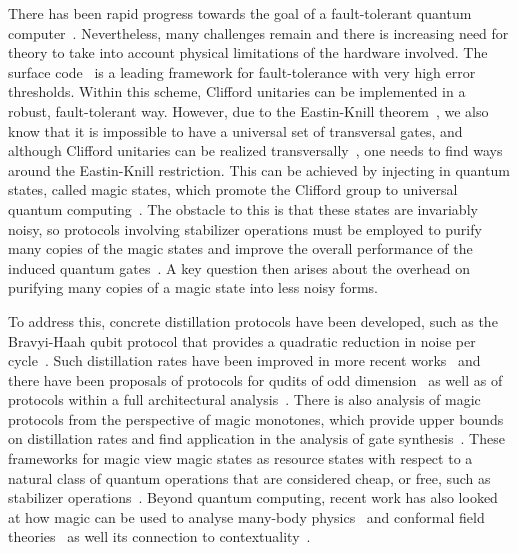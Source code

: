 \documentclass[pra,
aps,
twocolumn,
superscriptaddress,
groupedaddress,
nofootinbib,
reprint
]{revtex4-1}
\begin{document}
There has been rapid progress towards the goal of a fault-tolerant quantum computer~\cite{campbell_roads_2017, cit:raussendorf, Raussendorf_2013, Nickerson_2014, Nikahd_2017, chao_2018, lin_pieceable_2020, Lin_2020, chamberland_2020, Bourassa_2021}. Nevertheless, many challenges remain and there is increasing need for theory to take into account physical limitations of the hardware involved. The surface code~\cite{Bravyi_1998, Freedman_2001, Dennis_2002, Raussendorf_2007} is a leading framework for fault-tolerance with very high error thresholds. Within this scheme, Clifford unitaries can be implemented in a robust, fault-tolerant way. However, due to the Eastin-Knill theorem~\cite{Eastin_2009}, we also know that it is impossible to have a universal set of transversal gates, and although Clifford unitaries can be realized transversally~\cite{Calderbank_1996, Steane_1996}, one needs to find ways around the Eastin-Knill restriction. This can be achieved by injecting in quantum states, called magic states, which promote the Clifford group to universal quantum computing~\cite{cit:bravyi}. The obstacle to this is that these states are invariably noisy, so protocols involving stabilizer operations must be employed to purify many copies of the magic states and improve the overall performance of the induced quantum gates~\cite{cit:bravyi, Jones_2013, Ogorman_2017}. A key question then arises about the overhead on purifying many copies of a magic state into less noisy forms. 

To address this, concrete distillation protocols have been developed, such as the Bravyi-Haah qubit protocol that provides a quadratic reduction in noise per cycle~\cite{Bravyi2012}. Such distillation rates have been improved in more recent works~\cite{Jones_2013, haah2017magic, Hastings2018, Litinski_2019} and there have been proposals of protocols for qudits of odd dimension~\cite{CampbellAnwar_2012, Anwar_2012, Dawkins_2015, Krishna2019, cit:prakash} as well as of protocols within a full architectural analysis~\cite{chamberland_very_2020, Chamberland2019faulttolerantmagic}. There is also analysis of magic protocols from the perspective of magic monotones, which provide upper bounds on distillation rates and find application in the analysis of gate synthesis~\cite{Campbell_2017, Howard_2017, Prakash_2018, Seddon_2021,leone2021renyi}. These frameworks for magic view magic states as resource states with respect to a natural class of quantum operations that are considered cheap, or free, such as stabilizer operations~\cite{Gour_2019, cit:ahmadi, cit:seddon, Wang_2019}. Beyond quantum computing, recent work has also looked at how magic can be used to analyse many-body physics~\cite{Sarkar_2020} and conformal field theories~\cite{White_2021} as well its connection to contextuality~\cite{Vega_2017, cit:howard2, Zurel_2020, Okay_2021, schmid2020structure, Schmid_2021}.
\end{document}
